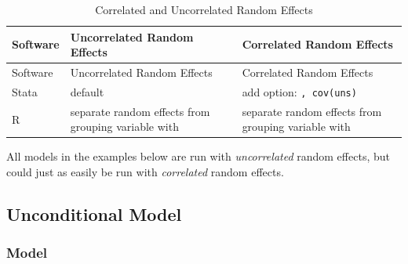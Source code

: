 \documentclass[
  letterpaper,
  DIV=11,
  numbers=noendperiod]{scrreprt}
\begin{document}
\begin{longtable}[]{@{}
  >{\raggedright\arraybackslash}p{}
  >{\raggedright\arraybackslash}p{}
  >{\raggedright\arraybackslash}p{}@{}}
\caption{Correlated and Uncorrelated Random
Effects}\label{tbl-REs}\tabularnewline
\toprule\noalign{}
\begin{minipage}[b]{\linewidth}\raggedright
Software
\end{minipage} & \begin{minipage}[b]{\linewidth}\raggedright
Uncorrelated Random Effects
\end{minipage} & \begin{minipage}[b]{\linewidth}\raggedright
Correlated Random Effects
\end{minipage} \\
\midrule\noalign{}
\endfirsthead
\toprule\noalign{}
\begin{minipage}[b]{\linewidth}\raggedright
Software
\end{minipage} & \begin{minipage}[b]{\linewidth}\raggedright
Uncorrelated Random Effects
\end{minipage} & \begin{minipage}[b]{\linewidth}\raggedright
Correlated Random Effects
\end{minipage} \\
\midrule\noalign{}
\endhead
\bottomrule\noalign{}
\endlastfoot
Stata & default & add option: \texttt{,\ cov(uns)} \\
R & separate random effects from grouping variable with
\texttt{\textbar{}\textbar{}} & separate random effects from grouping
variable with \texttt{\textbar{}} \\
\end{longtable}

All models in the examples below are run with \emph{uncorrelated} random
effects, but could just as easily be run with \emph{correlated} random
effects.

\subsection{Unconditional Model}\label{unconditional-model}

\subsubsection{Model}\label{model}
\end{document}
